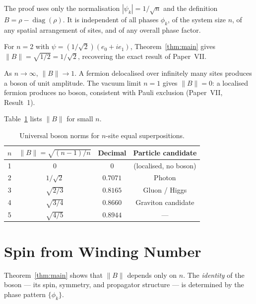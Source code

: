 \documentclass[11pt]{article}
\begin{document}
\begin{remark}
The proof uses only the normalisation $|\psi_k| = 1/\sqrt{n}$ and the
definition $B = \rho - \operatorname{diag}(\rho)$.
It is independent of all phases $\phi_k$, of the system size $n$, of any
spatial arrangement of sites, and of any overall phase factor.
\end{remark}

\begin{corollary}
For $n = 2$ with $\psi = (1/\sqrt{2})(e_0 + ie_1)$,
Theorem~\ref{thm:main} gives $\|B\| = \sqrt{1/2} = 1/\sqrt{2}$,
recovering the exact result of Paper~VII.
\end{corollary}

\begin{corollary}
As $n \to \infty$, $\|B\| \to 1$.
A fermion delocalised over infinitely many sites produces a boson of unit
amplitude.
The vacuum limit $n = 1$ gives $\|B\| = 0$: a localised fermion produces
no boson, consistent with Pauli exclusion (Paper~VII, Result~1).
\end{corollary}

Table~\ref{tab:norms} lists $\|B\|$ for small $n$.

\begin{table}[h]
\centering
\begin{tabular}{cccc}
\toprule
$n$ & $\|B\| = \sqrt{(n-1)/n}$ & Decimal & Particle candidate \\
\midrule
1 & $0$           & $0$      & (localised, no boson) \\
2 & $1/\sqrt{2}$  & $0.7071$ & Photon \\
3 & $\sqrt{2/3}$  & $0.8165$ & Gluon / Higgs \\
4 & $\sqrt{3/4}$  & $0.8660$ & Graviton candidate \\
5 & $\sqrt{4/5}$  & $0.8944$ & --- \\
\bottomrule
\end{tabular}
\caption{Universal boson norms for $n$-site equal superpositions.}
\label{tab:norms}
\end{table}

\section{Spin from Winding Number}
\label{sec:spin}

Theorem~\ref{thm:main} shows that $\|B\|$ depends only on $n$.
The \emph{identity} of the boson --- its spin, symmetry, and propagator
structure --- is determined by the phase pattern $\{\phi_k\}$.
\end{document}
